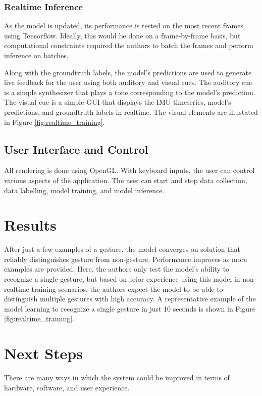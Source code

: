 \documentclass{nime-alternate} %
\begin{document}
\subsubsection{Realtime Inference}
As the model is updated, its performance is tested on the most recent frames using Tensorflow. Ideally, this would be done on a frame-by-frame basis, but computational constraints required the authors to batch the frames and perform inference on batches.

Along with the groundtruth labels, the model's predictions are used to generate live feedback for the user using both auditory and visual cues. The auditory cue is a simple synthesizer that plays a tone corresponding to the model's prediction. The visual cue is a simple GUI that displays the IMU timeseries, model's predictions, and groundtruth labels in realtime. The visual elements are illustated in Figure \ref{fig:realtime_training}.

\subsection{User Interface and Control}
All rendering is done using OpenGL. With keyboard inputs, the user can control various aspects of the application. The user can start and stop data collection, data labelling, model training, and model inference.

\section{Results}
After just a few examples of a gesture, the model converges on solution that reliably distinguishes gesture from non-gesture. Performance improves as more examples are provided. Here, the authors only test the model's ability to recognize a single gesture, but based on prior experience using this model in non-realtime training scenarios, the authors expect the model to be able to distinguish multiple gestures with high accuracy. A representative example of the model learning to recognize a single gesture in just 10 seconds is shown in Figure \ref{fig:realtime_training}.

\section{Next Steps}
There are many ways in which the system could be improved in terms of hardware, software, and user experience.
\end{document}
